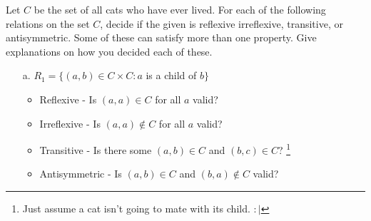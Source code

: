 \documentclass[a4paper,12pt]{book}
\newcounter{question}
\begin{document}
    \begin{questionNOGRADE}{\thequestion}

        Let $C$ be the set of all cats who have ever lived. For each of the
        following relations on the set $C$, decide if the given is
        reflexive irreflexive, transitive, or antisymmetric.
        Some of these can satisfy more than one property. Give
        explanations on how you decided each of these.

        \begin{itemize}
            \item[a.]   $R_{1} = \{ (a, b) \in C \times C : a$ is a child of $b \}$
                
                \begin{itemize}
                    \item   Reflexive - Is $(a,a) \in C$ for all $a$ valid?
                            
                    \item   Irreflexive - Is $(a,a) \not\in C$ for all $a$ valid?
                            
                    \item   Transitive - Is there some $(a,b) \in C$ and $(b,c) \in C$?
                            \footnote{Just assume a cat isn't going to mate with its child. $:|$}
                            
                    \item   Antisymmetric - Is $(a,b) \in C$ and $(b,a) \not\in C$ valid?
                \end{itemize}
            

\end{itemize}
\end{questionNOGRADE}
\end{document}
